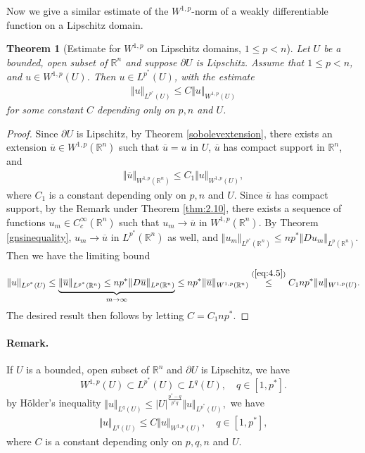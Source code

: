 \documentclass{article}
\numberwithin{equation}{section}
\newcommand{\bbR}{\mathbb{R}}
\newcommand{\ol}{\overline}
\theoremstyle{plain}
\newtheorem{theorem}{Theorem}[section]
\theoremstyle{definition}
\begin{document}
Now we give a similar estimate of the $W^{1,p}$-norm of a weakly differentiable function on a Lipschitz domain.

\begin{theorem}[Estimate for $W^{1,p}$ on Lipschitz domains, $1\leq p<n$]\label{thm:4.4}
Let $U$ be a bounded, open subset of $\bbR^n$ and suppose $\partial U$ is Lipschitz. Assume that $1\leq p< n$, and $u\in W^{1,p}(U)$. Then $u\in L^{p^*}(U)$, with the estimate
\begin{align*}
	\Vert u\Vert_{L^{p^*}(U)}\leq C\Vert u\Vert_{W^{1,p}(U)}
\end{align*}
for some constant $C$ depending only on $p,n$ and $U$.
\end{theorem}
\begin{proof}
Since $\partial U$ is Lipschitz, by Theorem \ref{sobolevextension}, there exists an extension $\ol{u}\in W^{1,p}(\bbR^n)$ such that $\ol{u}=u$ in $U$, $\ol{u}$ has compact support in $\bbR^n$, and
\begin{align}
	\Vert\ol{u}\Vert_{W^{1,p}(\bbR^n)}\leq C_1\Vert u\Vert_{W^{1,p}(U)},\label{eq:4.5}
\end{align}
where $C_1$ is a constant depending only on $p,n$ and $U$. Since $\ol{u}$ has compact support, by the Remark under Theorem \ref{thm:2.10}, there exists a sequence of functions $u_m\in C_c^\infty(\bbR^n)$ such that $u_m\to\ol{u}$ in $W^{1,p}(\bbR^n)$. By Theorem \ref{gnsinequality}, $u_m\to\ol{u}$ in $L^{p^*}(\bbR^n)$ as well, and $\Vert u_m\Vert_{L^{p^*}(\bbR^n)}\leq np^*\Vert Du_m\Vert_{L^p(\bbR^n)}$. Then we have the limiting bound
\begin{align*}
	\Vert u\Vert_{L^{p^*}(U)}\leq\underbrace{\Vert\ol{u}\Vert_{L^{p^*}(\bbR^n)}\leq np^*\Vert D\ol{u}\Vert_{L^p(\bbR^n)}}_{m\to\infty}\leq np^*\Vert \ol{u}\Vert_{W^{1,p}(\bbR^n)}\overset{(\ref{eq:4.5})}{\leq} C_1np^*\Vert u\Vert_{W^{1,p}(U)}.
\end{align*}
The desired result then follows by letting $C=C_1np^*$.
\end{proof}

\paragraph{Remark.} If $U$ is a bounded, open subset of $\bbR^n$ and $\partial U$ is Lipschitz, we have $$W^{1,p}(U)\subset L^{p^*}(U)\subset L^q(U),\quad q\in[1,p^*].$$
by Hölder's inequality $\Vert u\Vert_{L^q(U)}\leq\vert U\vert^{\frac{p^*-q}{p^*q}}\Vert u\Vert_{L^{p^*}(U)},$ we have
\begin{align*}
	\Vert u\Vert_{L^q(U)}\leq C\Vert u\Vert_{W^{1,p}(U)},\quad q\in[1,p^*],
\end{align*}
where $C$ is a constant depending only on $p,q,n$ and $U$.
\end{document}
